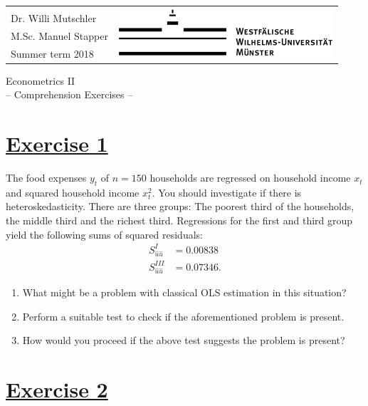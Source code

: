 \documentclass[captions=tableheading, 12pt, headings=small, parskip=half]{scrartcl}
\begin{document}
\begin{table}[H]
	\begin{tabular}{lr}
		& \multirow{4}{*}{\includegraphics[width = 8cm]{Code2/wwu_logo.png}}\\
		Dr. Willi Mutschler& \\
		M.Sc. Manuel Stapper & \\
		Summer term 2018 \hphantom{MMMMMMMMMMM}& 
	\end{tabular}
\end{table}
\vspace{1cm}
\begin{center}
	{\Large Econometrics II} \\
	-- Comprehension Exercises --
\end{center}

\section*{\underline{Exercise 1}}

The food expenses $y_t$ of $n=150$ households are regressed on household income
$x_t$ and squared household income $x_t^2$. You should investigate if there
is heteroskedasticity. There are three groups: The poorest third of the households,
the middle third and the richest third. Regressions for the first and third
group yield the following sums of squared residuals:
\begin{align*}
S_{\hat u \hat u}^I &=     0.00838 \\
S_{\hat u \hat u}^{III} &= 0.07346.
\end{align*}

\begin{enumerate}[label = \alph*)]
	\item What might be a problem with classical OLS estimation in this situation?
	\item Perform a suitable test to check if the aforementioned problem is present.
	\item How would you proceed if the above test suggests the problem is present? 
\end{enumerate}

\section*{\underline{Exercise 2}}
\end{document}
